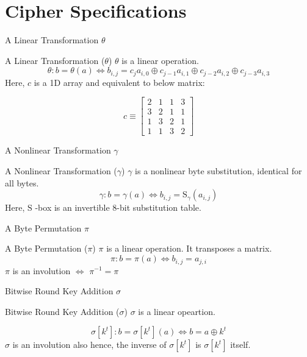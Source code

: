 \section{Cipher Specifications}

\begin{frame}{A Linear Transformation $\theta$}
  \begin{beamerboxesrounded}{A Linear Transformation ($\theta$)}
    $\theta$ is a linear operation.
    $$
      \theta: b=\theta(a) \Leftrightarrow b_{i, j}=c_{j} a_{i, 0} \oplus c_{j-1} a_{i, 1} \oplus c_{j-2} a_{i, 2} \oplus c_{j-3} a_{i, 3}
    $$
    Here, $c$ is a 1D array and equivalent to below matrix:

    \begin{equation*}
      c   \equiv \begin{bmatrix}
        2 & 1 & 1 & 3 \\
        3 & 2 & 1 & 1 \\
        1 & 3 & 2 & 1 \\
        1 & 1 & 3 & 2
      \end{bmatrix}
    \end{equation*}
  \end{beamerboxesrounded}
\end{frame}

\begin{frame}{A Nonlinear Transformation $\gamma$}
  \begin{beamerboxesrounded}{A Nonlinear Transformation ($\gamma$)}
    $\gamma$ is a nonlinear byte substitution, identical for all bytes.
    $$
      \gamma: b=\gamma(a) \Leftrightarrow b_{i, j}=\mathrm{S}_{\gamma}\left(a_{i, j}\right)
    $$
    Here, $\mathrm{S}$ -box is an invertible 8-bit substitution table.
  \end{beamerboxesrounded}
\end{frame}

\begin{frame}{A Byte Permutation $\pi$}
  \begin{beamerboxesrounded}{A Byte Permutation ($\pi$)}
    $\pi$ is a linear operation. It transposes a matrix.
    $$
      \pi: b=\pi(a) \Leftrightarrow b_{i, j}=a_{j, i}
    $$
    $\pi$ is an involution $\iff$ $\pi^{-1}=\pi$
  \end{beamerboxesrounded}
\end{frame}

\begin{frame}{Bitwise Round Key Addition $\sigma$}
  \begin{beamerboxesrounded}{Bitwise Round Key Addition ($\sigma$)}
    $\sigma$ is a linear opeartion.

    $$
      \sigma\left[k^{t}\right]: b=\sigma\left[k^{t}\right](a) \Leftrightarrow b=a \oplus k^{t}
    $$
    $\sigma$ is an involution also hence,
    the inverse of $\sigma\left[k^{t}\right]$ is $\sigma\left[k^{t}\right]$ itself.
  \end{beamerboxesrounded}
\end{frame}

